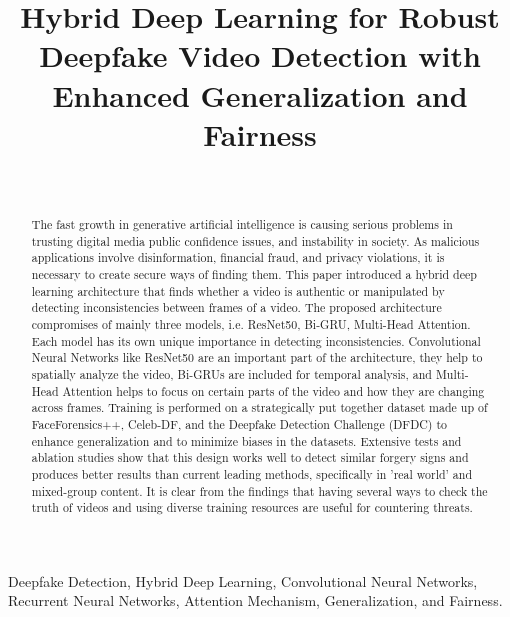\documentclass[conference]{IEEEtran}
\begin{document}
\title{Hybrid Deep Learning for Robust Deepfake Video Detection with Enhanced Generalization and Fairness}



\author{
\\ 
}


\maketitle

\begin{abstract}
The fast growth in generative artificial intelligence is causing serious problems in trusting digital media public confidence issues, and instability in society. As malicious applications involve disinformation, financial fraud, and privacy violations, it is  necessary to create secure ways of finding them. This paper introduced a hybrid deep learning architecture that finds whether a video is authentic or manipulated by detecting inconsistencies between frames of a video. The proposed architecture compromises of mainly three models, i.e. ResNet50, Bi-GRU, Multi-Head Attention. Each model has its own unique importance in detecting inconsistencies. Convolutional Neural Networks like ResNet50 are an important part of the architecture, they help to spatially analyze the video, Bi-GRUs are included for temporal analysis, and Multi-Head Attention helps to focus on certain parts of the video and how they are changing across frames. Training is performed on a strategically put together dataset made up of FaceForensics++, Celeb-DF, and the Deepfake Detection Challenge (DFDC) to enhance generalization and to minimize biases in the datasets. Extensive tests and ablation studies show that this design works well to detect similar forgery signs and produces better results than current leading methods, specifically in 'real world' and mixed-group content. It is clear from the findings that having several ways to check the truth of videos and using diverse training resources are useful for countering threats.
\end{abstract}

\begin{IEEEkeywords}
Deepfake Detection, Hybrid Deep Learning, Convolutional Neural Networks, Recurrent Neural Networks, Attention Mechanism, Generalization, and Fairness.
\end{IEEEkeywords}
\end{document}
